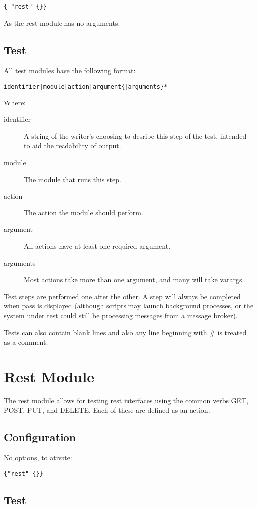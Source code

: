 \documentclass[12pt,a4paper,koma]{article}
\begin{document}
\begin{verbatim}
{ "rest" {}}
\end{verbatim}
As the rest module has no arguments.
\subsection{Test}
\label{sec-1-2}

All test modules have the following format:
\begin{verbatim}
identifier|module|action|argument{|arguments}*
\end{verbatim}
Where:
\begin{description}
\item[{identifier}] A string of the writer's choosing to desribe this
step of the test, intended to aid the readability of output.
\item[{module}] The module that runs this step.
\item[{action}] The action the module should perform.
\item[{argument}] All actions have at least one required argument.
\item[{arguments}] Most actions take more than one argument, and many
will take varargs.
\end{description}

Test steps are performed one after the other. A step will always be completed
when pass is displayed (although scripts may launch background processes, or
the system under test could still be processing messages from a message broker).

Tests can also contain blank lines and also any line beginning with \# is
treated as a comment.
\section{Rest Module}
\label{sec-2}
The rest module allows for testing rest interfaces using the common verbs
GET, POST, PUT, and DELETE. Each of these are defined as an action.

\subsection{Configuration}
\label{sec-2-1}

No options, to ativate:

\begin{verbatim}
{"rest" {}}
\end{verbatim}
\subsection{Test}
\label{sec-2-2}
\end{document}
